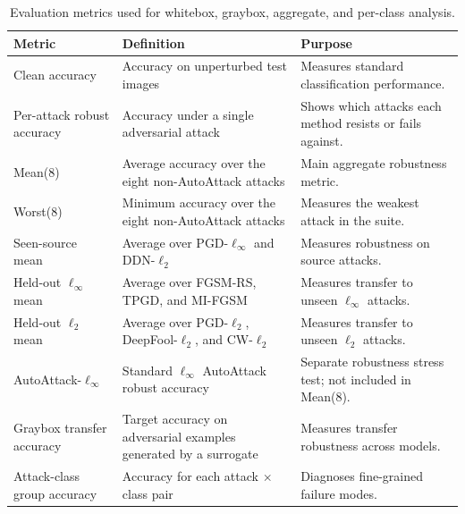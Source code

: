 \begin{table}[H]
\centering
\caption{Evaluation metrics used for whitebox, graybox, aggregate, and per-class analysis.}
\label{tab:ch5_evaluation_metrics_summary}
\footnotesize
\setlength{\tabcolsep}{4pt}
\renewcommand{\arraystretch}{1.08}
\begin{tabularx}{\textwidth}{@{}
>{\raggedright\arraybackslash}p{}
>{\raggedright\arraybackslash}p{}
>{\raggedright\arraybackslash}X
@{}}
\toprule
Metric & Definition & Purpose \\
\midrule
Clean accuracy
& Accuracy on unperturbed test images
& Measures standard classification performance. \\

Per-attack robust accuracy
& Accuracy under a single adversarial attack
& Shows which attacks each method resists or fails against. \\

Mean(8)
& Average accuracy over the eight non-AutoAttack attacks
& Main aggregate robustness metric. \\

Worst(8)
& Minimum accuracy over the eight non-AutoAttack attacks
& Measures the weakest attack in the suite. \\

Seen-source mean
& Average over PGD-$\ell_\infty$ and DDN-$\ell_2$
& Measures robustness on source attacks. \\

Held-out $\ell_\infty$ mean
& Average over FGSM-RS, TPGD, and MI-FGSM
& Measures transfer to unseen $\ell_\infty$ attacks. \\

Held-out $\ell_2$ mean
& Average over PGD-$\ell_2$, DeepFool-$\ell_2$, and CW-$\ell_2$
& Measures transfer to unseen $\ell_2$ attacks. \\

AutoAttack-$\ell_\infty$
& Standard $\ell_\infty$ AutoAttack robust accuracy
& Separate robustness stress test; not included in Mean(8). \\

Graybox transfer accuracy
& Target accuracy on adversarial examples generated by a surrogate
& Measures transfer robustness across models. \\

Attack-class group accuracy
& Accuracy for each attack $\times$ class pair
& Diagnoses fine-grained failure modes. \\
\bottomrule
\end{tabularx}
\end{table}
